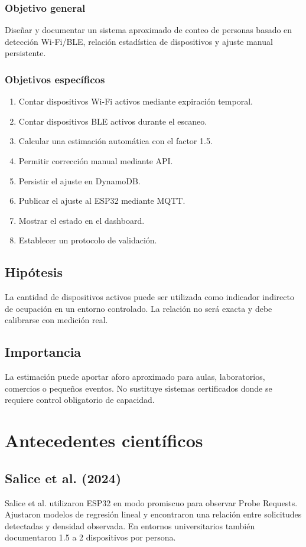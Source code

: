 \documentclass[12pt,a4paper]{article}
\begin{document}
\subsubsection{Objetivo general}
Diseñar y documentar un sistema aproximado de conteo de personas basado en detección Wi-Fi/BLE, relación estadística de dispositivos y ajuste manual persistente.

\subsubsection{Objetivos específicos}
\begin{enumerate}
\item Contar dispositivos Wi-Fi activos mediante expiración temporal.
\item Contar dispositivos BLE activos durante el escaneo.
\item Calcular una estimación automática con el factor 1.5.
\item Permitir corrección manual mediante API.
\item Persistir el ajuste en DynamoDB.
\item Publicar el ajuste al ESP32 mediante MQTT.
\item Mostrar el estado en el dashboard.
\item Establecer un protocolo de validación.
\end{enumerate}

\subsection{Hipótesis}
La cantidad de dispositivos activos puede ser utilizada como indicador indirecto de ocupación en un entorno controlado. La relación no será exacta y debe calibrarse con medición real.

\subsection{Importancia}
La estimación puede aportar aforo aproximado para aulas, laboratorios, comercios o pequeños eventos. No sustituye sistemas certificados donde se requiere control obligatorio de capacidad.

\section{Antecedentes científicos}
\subsection{Salice et al. (2024)}
Salice et al. utilizaron ESP32 en modo promiscuo para observar Probe Requests. Ajustaron modelos de regresión lineal y encontraron una relación entre solicitudes detectadas y densidad observada. En entornos universitarios también documentaron 1.5 a 2 dispositivos por persona.
\end{document}
